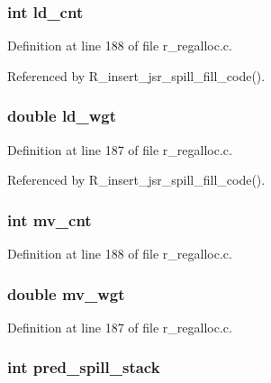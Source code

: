 \subsubsection{\setlength{\rightskip}{0pt plus 5cm}int \bf{ld\_\-cnt}}\label{r__regalloc_8c_b12189c686485593a22fead8b67c32ef}




Definition at line 188 of file r\_\-regalloc.c.

Referenced by R\_\-insert\_\-jsr\_\-spill\_\-fill\_\-code().
\subsubsection{\setlength{\rightskip}{0pt plus 5cm}double \bf{ld\_\-wgt}}\label{r__regalloc_8c_9909e0445ef838082b0c63a06a731d2b}




Definition at line 187 of file r\_\-regalloc.c.

Referenced by R\_\-insert\_\-jsr\_\-spill\_\-fill\_\-code().
\subsubsection{\setlength{\rightskip}{0pt plus 5cm}int \bf{mv\_\-cnt}}\label{r__regalloc_8c_ad328b799284edf18d18c9b67358bf1f}




Definition at line 188 of file r\_\-regalloc.c.
\subsubsection{\setlength{\rightskip}{0pt plus 5cm}double \bf{mv\_\-wgt}}\label{r__regalloc_8c_bfce554b6a8275c861c701bfc72d7b93}




Definition at line 187 of file r\_\-regalloc.c.
\subsubsection{\setlength{\rightskip}{0pt plus 5cm}int \bf{pred\_\-spill\_\-stack}}\label{r__regalloc_8c_f7c2e397f4ba08a61ff6f5e4dd5391df}




